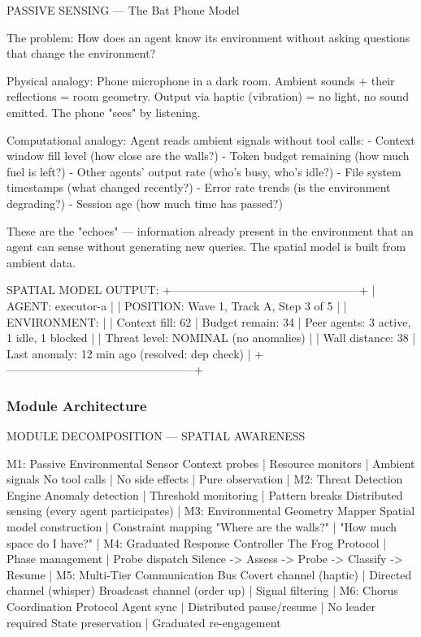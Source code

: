 \documentclass[11pt,letterpaper]{article}
\begin{document}
\begin{asciibox}
PASSIVE SENSING — The Bat Phone Model

  The problem: How does an agent know its environment
  without asking questions that change the environment?

  Physical analogy:
    Phone microphone in a dark room.
    Ambient sounds + their reflections = room geometry.
    Output via haptic (vibration) = no light, no sound emitted.
    The phone "sees" by listening.

  Computational analogy:
    Agent reads ambient signals without tool calls:
    - Context window fill level (how close are the walls?)
    - Token budget remaining (how much fuel is left?)
    - Other agents' output rate (who's busy, who's idle?)
    - File system timestamps (what changed recently?)
    - Error rate trends (is the environment degrading?)
    - Session age (how much time has passed?)

  These are the "echoes" — information already present in
  the environment that an agent can sense without generating
  new queries. The spatial model is built from ambient data.

  SPATIAL MODEL OUTPUT:
  +--------------------------------------------------+
  | AGENT: executor-a                                 |
  | POSITION: Wave 1, Track A, Step 3 of 5           |
  | ENVIRONMENT:                                      |
  |   Context fill:  62%
  |   Budget remain: 34%
  |   Peer agents:   3 active, 1 idle, 1 blocked     |
  |   Threat level:  NOMINAL (no anomalies)           |
  |   Wall distance: 38%
  |   Last anomaly:  12 min ago (resolved: dep check) |
  +--------------------------------------------------+
\end{asciibox}

\subsubsection{Module Architecture}

\begin{asciibox}
MODULE DECOMPOSITION — SPATIAL AWARENESS

  M1: Passive Environmental Sensor
      Context probes | Resource monitors | Ambient signals
      No tool calls | No side effects | Pure observation
          |
  M2: Threat Detection Engine
      Anomaly detection | Threshold monitoring | Pattern breaks
      Distributed sensing (every agent participates)
          |
  M3: Environmental Geometry Mapper
      Spatial model construction | Constraint mapping
      "Where are the walls?" | "How much space do I have?"
          |
  M4: Graduated Response Controller
      The Frog Protocol | Phase management | Probe dispatch
      Silence -> Assess -> Probe -> Classify -> Resume
          |
  M5: Multi-Tier Communication Bus
      Covert channel (haptic) | Directed channel (whisper)
      Broadcast channel (order up) | Signal filtering
          |
  M6: Chorus Coordination Protocol
      Agent sync | Distributed pause/resume | No leader required
      State preservation | Graduated re-engagement
\end{asciibox}
\end{document}
